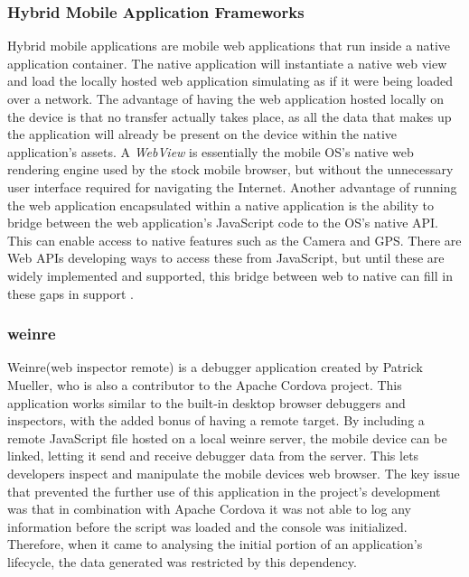 \documentclass[final]{cmpreport}
\begin{document}
\subsubsection{Hybrid Mobile Application Frameworks}
Hybrid mobile applications are mobile web applications that run inside a native application container. The native application will instantiate a native web view and load the locally hosted web application simulating as if it were being loaded over a network. The advantage of having the web application hosted locally on the device is that no transfer actually takes place, as all the data that makes up the application will already be present on the device within the native application's assets. A \textit{WebView} is essentially the mobile OS's native web rendering engine used by the stock mobile browser, but without the unnecessary user interface required for navigating the Internet. Another advantage of running the web application encapsulated within a native application is the ability to bridge between the web application's JavaScript code to the OS's native API. This can enable access to native features such as the Camera and GPS. There are Web APIs developing ways to access these from JavaScript, but until these are widely implemented and supported, this bridge between web to native can fill in these gaps in support \cite{Smith}.

\subsubsection{weinre}
\label{sec:weinre}
Weinre\footnotemark (web inspector remote) is a debugger application created by Patrick Mueller\footnotemark, who is also a contributor to the Apache Cordova project. This application works similar to the built-in desktop browser debuggers and inspectors, with the added bonus of having a remote target. By including a remote JavaScript file hosted on a local weinre server, the mobile device can be linked, letting it send and receive debugger data from the server. This lets developers inspect and manipulate the mobile devices web browser. The key issue that prevented the further use of this application in the project's development was that in combination with Apache Cordova it was not able to log any information before the script was loaded and the console was initialized. Therefore, when it came to analysing the initial portion of an application's lifecycle, the data generated was restricted by this dependency.

\end{document}
